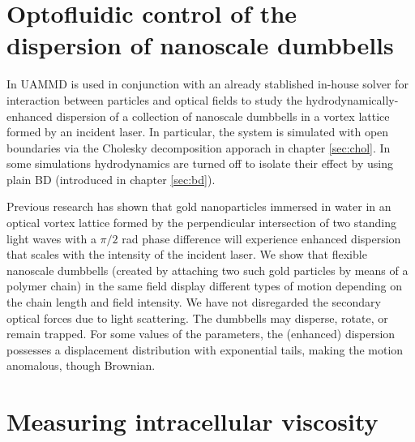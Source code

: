 \documentclass[ twoside,openright,titlepage,numbers=noenddot,%
headinclude,footinclude,cleardoublepage=empty,abstract=on,
BCOR=5mm,paper=a4,fontsize=11pt, dvipsnames
]{scrreprt}
\newcommand{\uammd}{\gls{UAMMD}\xspace}
\begin{document}
\chapter{Optofluidic control of the dispersion of nanoscale dumbbells}

In \cite{Melendez2019} \uammd is used in conjunction with an already stablished in-house solver for interaction between particles and optical fields to study the hydrodynamically-enhanced dispersion of a collection of nanoscale dumbbells in a vortex lattice formed by an incident laser. In particular, the system is simulated with open boundaries via the Cholesky decomposition apporach in chapter \ref{sec:chol}. In some simulations hydrodynamics are turned off to isolate their effect by using plain \gls{BD} (introduced in chapter \ref{sec:bd}).

Previous research has shown that gold nanoparticles immersed in water in an optical vortex lattice formed by the perpendicular intersection of two standing light waves with a $\pi/2$ rad phase difference will experience enhanced dispersion that scales with the intensity of the incident laser. We show that flexible nanoscale dumbbells (created by attaching two such gold particles by means of a polymer chain) in the same field display different types of motion depending on the chain length and field intensity. We have not disregarded the secondary optical forces due to light scattering. The dumbbells may disperse, rotate, or remain trapped. For some values of the parameters, the (enhanced) dispersion possesses a displacement distribution with exponential tails, making the motion anomalous, though Brownian.

\chapter{Measuring intracellular viscosity}
\end{document}
